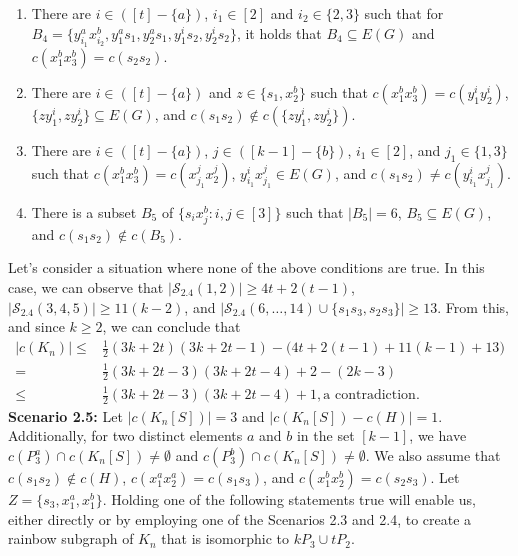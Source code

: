 \documentclass[12pt]{article}
\begin{document}
\begin{enumerate}
\item There are $i\in([t]-\{a\})$, $i_1\in[2]$ and $i_2\in\{2,3\}$ such that for $B_4=\{y^a_{i_1}x^b_{i_2},y^a_1s_1,y^a_2s_1,y^i_1s_2,y^i_2s_2\}$, it holds that $B_4\subseteq E(G)$ and $c(x^b_1x^b_3)=c(s_2s_2)$.
\item There are $i\in([t]-\{a\})$ and $z\in\{s_1,x^b_2\}$ such that $c(x^b_1x^b_3)=c(y^i_1y^i_2)$, $\{zy^i_1,zy^i_2\}\subseteq E(G)$, and $c(s_1s_2)\notin c(\{zy^i_1,zy^i_2\})$. 
\item There are $i\in([t]-\{a\})$, $j\in ([k-1]-\{b\})$, $i_1\in[2]$, and $j_1\in\{1,3\}$ such that $c(x^b_1x^b_3)=c(x^j_{j_1}x^j_2)$, $y^i_{i_1}x^j_{j_1}\in E(G)$,  and $c(s_1s_2)\neq c(y^i_{i_1}x^j_{j_1})$.
\item There is a subset $B_5$ of $\{s_ix^b_j:i,j\in[3]\}$ such that $|B_5|=6$, $B_5\subseteq E(G)$, and $c(s_1s_2)\not\in c(B_5)$.
\end{enumerate}
Let's consider a situation where none of the above conditions are true. In this case, we can observe that $|\mathcal{S}_{2.4}(1,2)| \geq 4t + 2(t - 1)$, $|\mathcal{S}_{2.4}(3,4,5)| \geq 11(k-2)$, and $|\mathcal{S}_{2.4}(6,\ldots,14) \cup \{s_1s_3,s_2s_3\}| \geq 13$. From this, and since $k \geq 2$, we can conclude that
  \begin{align*}
  |c(K_n)|\leq & \frac{1}{2}(3k+2t)(3k+2t-1)-\big(4t+2(t-1)+11(k-1)+13\big)\\
  =& \frac{1}{2}(3k+2t-3)(3k+2t-4)+2-(2k-3)\\
  \leq &\frac{1}{2}(3k+2t-3)(3k+2t-4)+1,\text{a contradiction}.
\end{align*}
{\bf Scenario 2.5:}  Let \(|c(K_n[S])| = 3\) and \(|c(K_n[S]) - c(H)| = 1\). Additionally, for two distinct elements \(a\) and \(b\) in the set \([k-1]\), we have \(c(P_3^a) \cap c(K_n[S]) \neq \emptyset\) and \(c(P_3^b) \cap c(K_n[S]) \neq \emptyset\). We also assume that \(c(s_1s_2) \notin c(H)\), \(c(x_1^a x_2^a) = c(s_1s_3)\), and \(c(x_1^b x_2^b) = c(s_2s_3)\). 
Let \(Z = \{s_3, x_1^a, x_1^b\}\). Holding one of the following statements true will enable us, either directly or by employing one of the Scenarios 2.3 and 2.4, to create a rainbow subgraph of \(K_n\) that is isomorphic to \(kP_3 \cup tP_2\).
\end{document}
